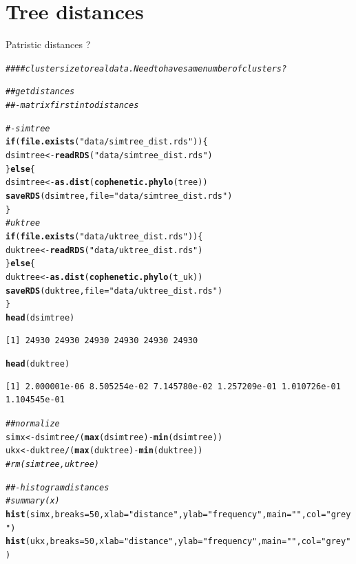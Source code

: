 \documentclass[]{revtex4}\usepackage[]{graphicx}\usepackage[]{color}
\makeatletter
\newcommand{\hlnum}[1]{\textcolor[rgb]{0.686,0.059,0.569}{#1}}%
\newcommand{\hlstr}[1]{\textcolor[rgb]{0.192,0.494,0.8}{#1}}%
\newcommand{\hlcom}[1]{\textcolor[rgb]{0.678,0.584,0.686}{\textit{#1}}}%
\newcommand{\hlopt}[1]{\textcolor[rgb]{0,0,0}{#1}}%
\newcommand{\hlstd}[1]{\textcolor[rgb]{0.345,0.345,0.345}{#1}}%
\newcommand{\hlkwa}[1]{\textcolor[rgb]{0.161,0.373,0.58}{\textbf{#1}}}%
\newcommand{\hlkwb}[1]{\textcolor[rgb]{0.69,0.353,0.396}{#1}}%
\newcommand{\hlkwc}[1]{\textcolor[rgb]{0.333,0.667,0.333}{#1}}%
\newcommand{\hlkwd}[1]{\textcolor[rgb]{0.737,0.353,0.396}{\textbf{#1}}}%
\newenvironment{kframe}{%
 \def\at@end@of@kframe{}%
 \ifinner\ifhmode%
  \def\at@end@of@kframe{\end{minipage}}%
  \begin{minipage}{\columnwidth}%
 \fi\fi%
 \def\FrameCommand##1{\hskip\@totalleftmargin \hskip-\fboxsep
 \colorbox{shadecolor}{##1}\hskip-\fboxsep
     \hskip-\linewidth \hskip-\@totalleftmargin \hskip\columnwidth}%
 \MakeFramed {\advance\hsize-\width
   \@totalleftmargin\z@ \linewidth\hsize
   \@setminipage}}%
 {\par\unskip\endMakeFramed%
 \at@end@of@kframe}
\newenvironment{knitrout}{}{} %
\makeatother
\begin{document}
\section{Tree distances}
Patristic distances ?
\begin{knitrout}
\color{fgcolor}\begin{kframe}
\begin{alltt}
\hlcom{####  cluster size to real data. Need to have same number of clusters ?}

\hlcom{## get distances}
\hlcom{##- matrix first into distances}

\hlcom{#- sim tree}
\hlkwa{if} \hlstd{(}\hlkwd{file.exists}\hlstd{(}\hlstr{"data/simtree_dist.rds"}\hlstd{))\{}
  \hlstd{dsimtree} \hlkwb{<-} \hlkwd{readRDS}\hlstd{(}\hlstr{"data/simtree_dist.rds"}\hlstd{)}
\hlstd{\}} \hlkwa{else} \hlstd{\{}
\hlstd{dsimtree} \hlkwb{<-} \hlkwd{as.dist}\hlstd{(}\hlkwd{cophenetic.phylo}\hlstd{(tree))}
\hlkwd{saveRDS}\hlstd{(dsimtree,} \hlkwc{file} \hlstd{=} \hlstr{"data/simtree_dist.rds"}\hlstd{)}
\hlstd{\}}
\hlcom{# uk tree}
\hlkwa{if} \hlstd{(}\hlkwd{file.exists}\hlstd{(}\hlstr{"data/uktree_dist.rds"}\hlstd{))\{}
  \hlstd{duktree} \hlkwb{<-} \hlkwd{readRDS}\hlstd{(}\hlstr{"data/uktree_dist.rds"}\hlstd{)}
\hlstd{\}} \hlkwa{else} \hlstd{\{}
  \hlstd{duktree} \hlkwb{<-} \hlkwd{as.dist}\hlstd{(}\hlkwd{cophenetic.phylo}\hlstd{(t_uk))}
  \hlkwd{saveRDS}\hlstd{(duktree,} \hlkwc{file} \hlstd{=} \hlstr{"data/uktree_dist.rds"}\hlstd{)}
\hlstd{\}}
\hlkwd{head}\hlstd{(dsimtree)}
\end{alltt}
\begin{verbatim}
[1] 24930 24930 24930 24930 24930 24930
\end{verbatim}
\begin{alltt}
\hlkwd{head}\hlstd{(duktree)}
\end{alltt}
\begin{verbatim}
[1] 2.000001e-06 8.505254e-02 7.145780e-02 1.257209e-01 1.010726e-01 1.104545e-01
\end{verbatim}
\begin{alltt}
\hlcom{## normalize}
\hlstd{simx} \hlkwb{<-} \hlstd{dsimtree} \hlopt{/} \hlstd{(}\hlkwd{max}\hlstd{(dsimtree)} \hlopt{-} \hlkwd{min}\hlstd{(dsimtree))}
\hlstd{ukx} \hlkwb{<-} \hlstd{duktree} \hlopt{/} \hlstd{(}\hlkwd{max}\hlstd{(duktree)} \hlopt{-} \hlkwd{min}\hlstd{(duktree))}
\hlcom{# rm(simtree, uktree)}

\hlcom{##- histogram distances}
\hlcom{# summary(x)}
\hlkwd{hist}\hlstd{(simx,} \hlkwc{breaks} \hlstd{=} \hlnum{50}\hlstd{,} \hlkwc{xlab} \hlstd{=} \hlstr{"distance"}\hlstd{,} \hlkwc{ylab} \hlstd{=} \hlstr{"frequency"}\hlstd{,} \hlkwc{main} \hlstd{=} \hlstr{""}\hlstd{,} \hlkwc{col} \hlstd{=} \hlstr{"grey"}\hlstd{)}
\hlkwd{hist}\hlstd{(ukx,} \hlkwc{breaks} \hlstd{=} \hlnum{50}\hlstd{,} \hlkwc{xlab} \hlstd{=} \hlstr{"distance"}\hlstd{,} \hlkwc{ylab} \hlstd{=} \hlstr{"frequency"}\hlstd{,} \hlkwc{main} \hlstd{=} \hlstr{""}\hlstd{,} \hlkwc{col} \hlstd{=} \hlstr{"grey"}\hlstd{)}
\end{alltt}
\end{kframe}


\end{knitrout}
\end{document}
